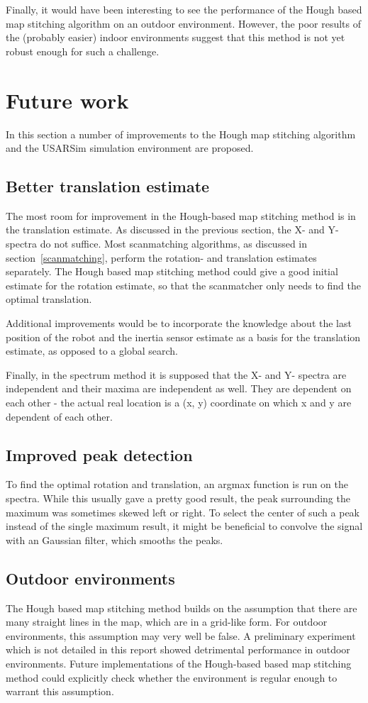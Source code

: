 Finally, it would have been interesting to see the performance of the Hough based map stitching algorithm on an outdoor environment. However, the poor results of the (probably easier) indoor environments suggest that this method is not yet robust enough for such a challenge.

\section{Future work}
\label{futurework}
In this section a number of improvements to the Hough map stitching algorithm and the USARSim simulation environment are proposed. 

\subsection{Better translation estimate}
The most room for improvement in the Hough-based map stitching method is in the translation estimate. As discussed in the previous section, the X- and Y-spectra do not suffice. Most scanmatching algorithms, as discussed in section~\ref{scanmatching}, perform the rotation- and translation estimates separately. The Hough based map stitching method could give a good initial estimate for the rotation estimate, so that the scanmatcher only needs to find the optimal translation. 

Additional improvements would be to incorporate the knowledge about the last position of the robot and the inertia sensor estimate as a basis for the translation estimate, as opposed to a global search. 

Finally, in the spectrum method it is supposed that the X- and Y- spectra are independent and their maxima are independent as well. They are dependent on each other - the actual real location is a (x, y) coordinate on which x and y are dependent of each other.

\subsection{Improved peak detection}
To find the optimal rotation and translation, an argmax function is run on the spectra. While this usually gave a pretty good result, the peak surrounding the maximum was sometimes skewed left or right. To select the center of such a peak instead of the single maximum result, it might be beneficial to convolve the signal with an Gaussian filter, which smooths the peaks.

\subsection{Outdoor environments}
The Hough based map stitching method builds on the assumption that there are many straight lines in the map, which are in a grid-like form. For outdoor environments, this assumption may very well be false. A preliminary experiment which is not detailed in this report showed detrimental performance in outdoor environments. Future implementations of the Hough-based based map stitching method could explicitly check whether the environment is regular enough to warrant this assumption.

